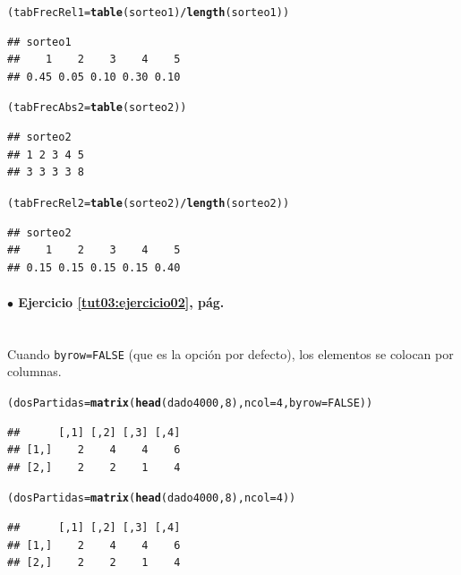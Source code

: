 \documentclass[10pt,a4paper]{article}\usepackage[]{graphicx}\usepackage[]{color}
\makeatletter
\newcommand{\hlnum}[1]{\textcolor[rgb]{0.686,0.059,0.569}{#1}}%
\newcommand{\hlopt}[1]{\textcolor[rgb]{0,0,0}{#1}}%
\newcommand{\hlstd}[1]{\textcolor[rgb]{0.345,0.345,0.345}{#1}}%
\newcommand{\hlkwb}[1]{\textcolor[rgb]{0.69,0.353,0.396}{#1}}%
\newcommand{\hlkwc}[1]{\textcolor[rgb]{0.333,0.667,0.333}{#1}}%
\newcommand{\hlkwd}[1]{\textcolor[rgb]{0.737,0.353,0.396}{\textbf{#1}}}%
\newenvironment{kframe}{%
 \def\at@end@of@kframe{}%
 \ifinner\ifhmode%
  \def\at@end@of@kframe{\end{minipage}}%
  \begin{minipage}{\columnwidth}%
 \fi\fi%
 \def\FrameCommand##1{\hskip\@totalleftmargin \hskip-\fboxsep
 \colorbox{shadecolor}{##1}\hskip-\fboxsep
     \hskip-\linewidth \hskip-\@totalleftmargin \hskip\columnwidth}%
 \MakeFramed {\advance\hsize-\width
   \@totalleftmargin\z@ \linewidth\hsize
   \@setminipage}}%
 {\par\unskip\endMakeFramed%
 \at@end@of@kframe}
\newenvironment{knitrout}{}{} %
\makeatother
\begin{document}
\begin{knitrout}
\begin{kframe}
\begin{alltt}
\hlstd{(tabFrecRel1}  \hlkwb{=} \hlkwd{table}\hlstd{(sorteo1)} \hlopt{/} \hlkwd{length}\hlstd{(sorteo1) )}
\end{alltt}
\begin{verbatim}
## sorteo1
##    1    2    3    4    5 
## 0.45 0.05 0.10 0.30 0.10
\end{verbatim}
\begin{alltt}
\hlstd{(tabFrecAbs2}  \hlkwb{=} \hlkwd{table}\hlstd{(sorteo2))}
\end{alltt}
\begin{verbatim}
## sorteo2
## 1 2 3 4 5 
## 3 3 3 3 8
\end{verbatim}
\begin{alltt}
\hlstd{(tabFrecRel2}  \hlkwb{=} \hlkwd{table}\hlstd{(sorteo2)} \hlopt{/} \hlkwd{length}\hlstd{(sorteo2) )}
\end{alltt}
\begin{verbatim}
## sorteo2
##    1    2    3    4    5 
## 0.15 0.15 0.15 0.15 0.40
\end{verbatim}
\end{kframe}
\end{knitrout}

\paragraph{\bf $\bullet$ Ejercicio \ref{tut03:ejercicio02}, pág. \pageref{tut03:ejercicio02}}
\label{tut03:ejercicio02:sol}\quad\\

Cuando {\tt byrow=FALSE} (que es la opción por defecto), los elementos se colocan por columnas.
\begin{knitrout}
\color{fgcolor}\begin{kframe}
\begin{alltt}
\hlstd{(dosPartidas} \hlkwb{=} \hlkwd{matrix}\hlstd{(}\hlkwd{head}\hlstd{(dado4000,} \hlnum{8}\hlstd{),} \hlkwc{ncol} \hlstd{=} \hlnum{4}\hlstd{,} \hlkwc{byrow} \hlstd{=} \hlnum{FALSE}\hlstd{))}
\end{alltt}
\begin{verbatim}
##      [,1] [,2] [,3] [,4]
## [1,]    2    4    4    6
## [2,]    2    2    1    4
\end{verbatim}
\begin{alltt}
\hlstd{(dosPartidas} \hlkwb{=} \hlkwd{matrix}\hlstd{(}\hlkwd{head}\hlstd{(dado4000,} \hlnum{8}\hlstd{),} \hlkwc{ncol} \hlstd{=} \hlnum{4}\hlstd{))}
\end{alltt}
\begin{verbatim}
##      [,1] [,2] [,3] [,4]
## [1,]    2    4    4    6
## [2,]    2    2    1    4
\end{verbatim}
\end{kframe}
\end{knitrout}
\end{document}
